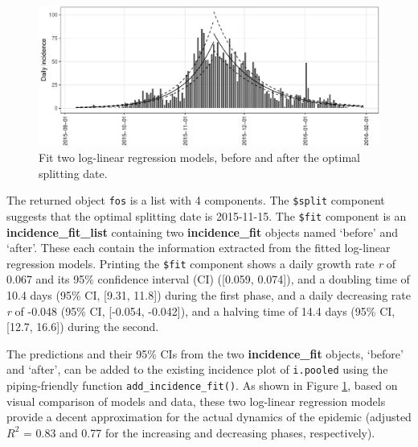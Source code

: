 \documentclass[9pt,a4paper]{extarticle}
\newenvironment{Shaded}{\begin{snugshade}}{\end{snugshade}}
\newcommand{\DataTypeTok}[1]{\textcolor[rgb]{0.13,0.29,0.53}{#1}}
\newcommand{\KeywordTok}[1]{\textcolor[rgb]{0.13,0.29,0.53}{\textbf{#1}}}
\newcommand{\NormalTok}[1]{#1}
\newcommand{\OperatorTok}[1]{\textcolor[rgb]{0.81,0.36,0.00}{\textbf{#1}}}
\newcommand{\StringTok}[1]{\textcolor[rgb]{0.31,0.60,0.02}{#1}}
\begin{document}
\begin{Shaded}
\end{Shaded}

\begin{figure}[h!]
\centering
	\includegraphics[width=\textwidth]{figures/incidence-fit-1.pdf}
	\caption{\label{fig:incidence-fit}Fit two log-linear regression models, before and after the optimal splitting date.}
\end{figure}

The returned object \texttt{fos} is a list with 4 components.
The \texttt{\$split} component suggests that the optimal splitting date is 2015-11-15.
The \texttt{\$fit} component is an \textbf{incidence\_fit\_list} containing two \textbf{incidence\_fit} objects named `before' and `after'.
These each contain the information extracted from the fitted log-linear regression models.
Printing the \texttt{\$fit} component shows a daily growth rate \textit{r} of 0.067 and its 95\% confidence interval (CI) ({[}0.059, 0.074{]}), and a doubling time of 10.4 days (95\% CI, {[}9.31, 11.8{]}) during the first phase, and a daily decreasing rate \textit{r} of -0.048 (95\% CI, {[}-0.054, -0.042{]}), and a halving time of 14.4 days (95\% CI, {[}12.7, 16.6{]}) during the second.

The predictions and their 95\% CIs from the two \textbf{incidence\_fit} objects, `before' and `after', can be added to the existing incidence plot of \texttt{i.pooled} using the piping-friendly function \texttt{add\_incidence\_fit()}.
As shown in Figure \ref{fig:incidence-fit}, based on visual comparison of models and data, these two log-linear regression models provide a decent approximation for the actual dynamics of the epidemic (adjusted $R^2$ = 0.83 and 0.77 for the increasing and decreasing phases, respectively).
\end{document}

